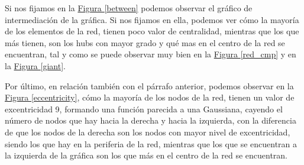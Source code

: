 \documentclass[paper=a4, fontsize=11pt]{article} %
\numberwithin{equation}{section} %
\numberwithin{figure}{section} %
\numberwithin{table}{section} %
\begin{document}
Si nos fijamos en la \hyperref[between]{Figura \ref*{between}} podemos observar el gráfico de intermediación de la gráfica. Si nos fijamos en ella, podemos ver cómo la mayoría de los elementos de la red, tienen poco valor de centralidad, mientras que los que más tienen, son los hubs con mayor grado y qué mas en el centro de la red se encuentran, tal y como se puede observar muy bien en la \hyperref[red_cmp]{Figura \ref*{red_cmp}} y en la \hyperref[giant]{Figura \ref*{giant}}.

Por último, en relación también con el párrafo anterior, podemos observar en la \hyperref[eccentricity]{Figura \ref*{eccentricity}}, cómo la mayoría de los nodos de la red, tienen un valor de excentricidad 9, formando una función parecida a una Gaussiana, cayendo el número de nodos que hay hacia la derecha y hacia la izquierda, con la diferencia de que los nodos de la derecha son los nodos con mayor nivel de excentricidad, siendo los que hay en la periferia de la red, mientras que los que se encuentran a la izquierda de la gráfica son los que más en el centro de la red se encuentran.
\end{document}
